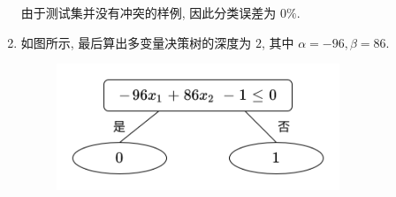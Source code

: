 \documentclass[answers]{exam}  %
\begin{document}
\begin{questions}
\begin{solution}
\begin{enumerate}
            由于测试集并没有冲突的样例, 因此分类误差为 $0\%$.

      \item

            如图所示, 最后算出多变量决策树的深度为 $2$, 其中 $\alpha=-96, \beta=86$.

            \begin{figure}[H]
              \centering
              \includegraphics[width=0.8\textwidth]{./figure/PS3-5-3.png}
              \label{Fig.main1}
            \end{figure}
    \end{enumerate}

  \end{solution}

\end{questions}
\end{document}
